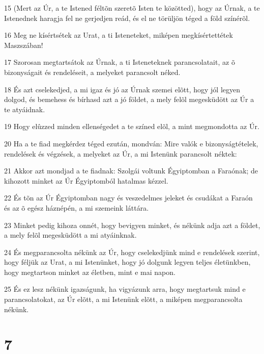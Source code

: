 \par 15 (Mert az Úr, a te Istened féltõn szeretõ Isten te közötted), hogy az Úrnak, a te Istenednek haragja fel ne gerjedjen reád, és el ne törüljön téged a föld színérõl.
\par 16 Meg ne kísértsétek az Urat, a ti Isteneteket, miképen  megkísértettétek Maszszában!
\par 17 Szorosan megtartsátok az Úrnak, a ti Isteneteknek parancsolatait, az õ bizonyságait és rendeléseit, a melyeket parancsolt néked.
\par 18 És azt cselekedjed, a mi igaz és jó az Úrnak szemei elõtt, hogy jól legyen dolgod, és bemehess és bírhasd azt a jó földet, a mely felõl megesküdött az Úr a te atyáidnak.
\par 19 Hogy elûzzed minden ellenségedet a te színed elõl, a mint megmondotta az Úr.
\par 20 Ha a te fiad megkérdez téged ezután, mondván: Mire valók e bizonyságtételek, rendelések és végzések, a melyeket az Úr, a mi Istenünk parancsolt néktek:
\par 21 Akkor azt mondjad a te fiadnak: Szolgái voltunk Égyiptomban a Faraónak; de kihozott minket az Úr Égyiptomból hatalmas kézzel.
\par 22 És tõn az Úr Égyiptomban nagy és veszedelmes jeleket és csudákat a Faraón és az õ egész háznépén, a mi szemeink láttára.
\par 23 Minket pedig kihoza onnét, hogy bevigyen minket, és nékünk adja azt a földet, a mely felõl megesküdött a mi atyáinknak.
\par 24 És megparancsolta nékünk az Úr, hogy cselekedjünk mind e rendelések szerint, hogy féljük az Urat, a mi Istenünket, hogy jó dolgunk legyen teljes életünkben, hogy megtartson minket az életben, mint e mai napon.
\par 25 És ez lesz nékünk igazságunk, ha vigyázunk arra, hogy megtartsuk mind e parancsolatokat, az Úr elõtt, a mi Istenünk elõtt, a miképen megparancsolta nékünk.

\chapter{7}

